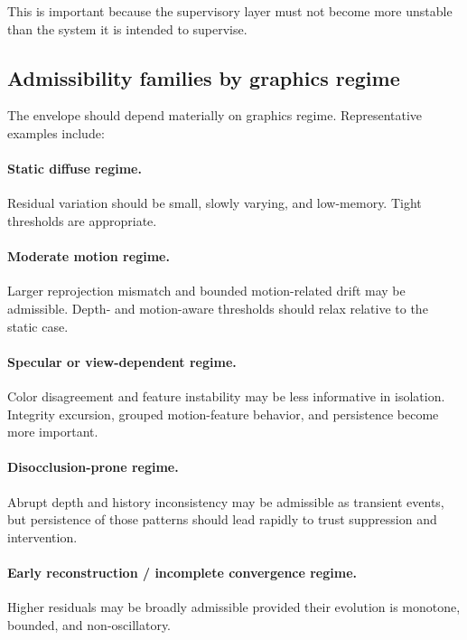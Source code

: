\documentclass[11pt,letterpaper]{article}
\theoremstyle{gcresult}
\theoremstyle{definition}
\begin{document}
This is important because the supervisory layer must not become more unstable than the system it is intended to supervise.


\subsection{Admissibility families by graphics regime}

The envelope should depend materially on graphics regime. Representative examples include:

\paragraph{Static diffuse regime.}
Residual variation should be small, slowly varying, and low-memory. Tight thresholds are appropriate.

\paragraph{Moderate motion regime.}
Larger reprojection mismatch and bounded motion-related drift may be admissible. Depth- and motion-aware thresholds should relax relative to the static case.

\paragraph{Specular or view-dependent regime.}
Color disagreement and feature instability may be less informative in isolation. Integrity excursion, grouped motion-feature behavior, and persistence become more important.

\paragraph{Disocclusion-prone regime.}
Abrupt depth and history inconsistency may be admissible as transient events, but persistence of those patterns should lead rapidly to trust suppression and intervention.

\paragraph{Early reconstruction / incomplete convergence regime.}
Higher residuals may be broadly admissible provided their evolution is monotone, bounded, and non-oscillatory.
\end{document}
